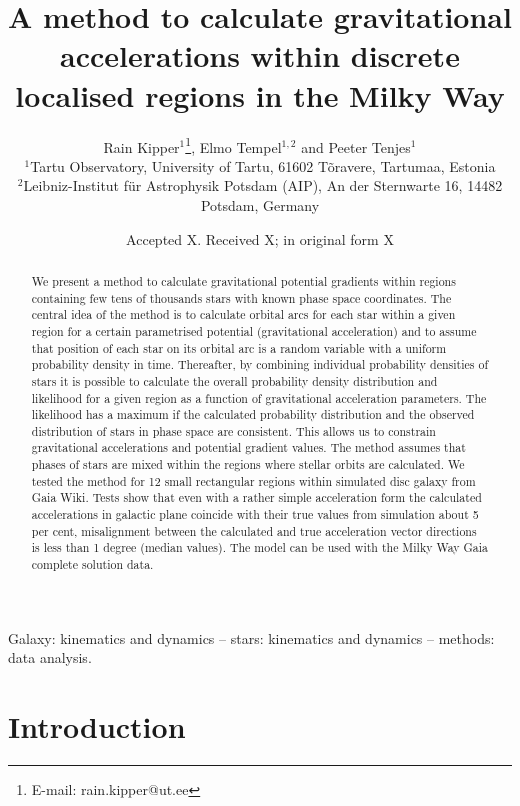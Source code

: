 \documentclass[fleqn,usenatbib]{mnras}
\title[Localised acceleration]
  {A method to calculate gravitational accelerations within discrete localised regions in the Milky Way}
\author[Rain Kipper, Elmo Tempel and Peeter Tenjes]{Rain Kipper$^{1}$\thanks{E-mail:
rain.kipper@ut.ee}, Elmo Tempel$^{1,2}$ and Peeter Tenjes$^{1}$\\
$^1$Tartu Observatory, University of Tartu, 61602 T\~oravere, Tartumaa, Estonia\\
$^{2}$Leibniz-Institut f\"ur Astrophysik Potsdam (AIP), An der Sternwarte 16, 14482 Potsdam, Germany
}
\date{Accepted X. Received X; in original form X}
\begin{document}
\label{firstpage}

\maketitle

\begin{abstract}

We present a method to calculate gravitational potential gradients within regions containing few tens of thousands stars with known phase space coordinates. 
The central idea of the method is to calculate orbital arcs for each star within a given region for a certain parametrised  potential (gravitational acceleration) and to assume that position of each star on its orbital arc is a random variable with a uniform probability density in time. Thereafter, by combining individual probability densities of stars it is possible to calculate the overall probability density distribution and likelihood for a given region as a function of gravitational acceleration parameters. The likelihood has a maximum if the calculated probability distribution and the observed distribution of stars in phase space are consistent. This allows us to constrain gravitational accelerations and potential gradient values. The method assumes that phases of stars are mixed within the regions where stellar orbits are calculated. We tested the method for 12 small rectangular regions within simulated disc galaxy from Gaia Wiki. Tests show that even with a rather simple acceleration form the calculated accelerations in galactic plane coincide with their true values from simulation about 5 per cent, misalignment between the calculated and true acceleration vector directions is less than 1 degree (median values). The model can be used with the Milky Way Gaia complete solution data. 
\end{abstract}
\begin{keywords}
Galaxy: kinematics and dynamics -- stars: kinematics and dynamics -- methods: data analysis.
\end{keywords}
\section{Introduction} 
\label{sec:introduction}
\end{document}
